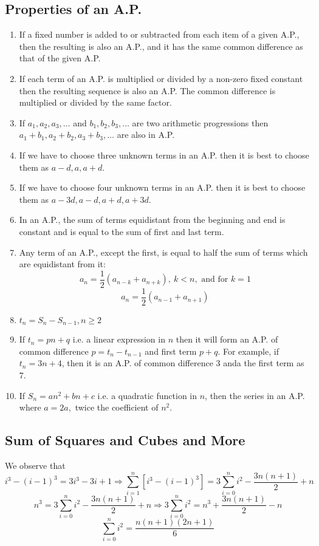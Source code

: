 \subsection{Properties of an A.P.}
\begin{enumerate}
\item If a fixed number is added to or subtracted from each item of a given A.P., then the resulting is also an A.P., and it has
  the same common difference as that of the given A.P.
\item If each term of an A.P. is multiplied or divided by a non-zero fixed constant then the resulting sequence is also an A.P. The
  common difference is multiplied or divided by the same factor.
\item If $a_1, a_2, a_3, \ldots$ and $b_1, b_2, b_3, \ldots$ are two arithmetic progressions then $a_1 + b_1, a_2 + b_2, a_3 + b_3,
  \ldots$ are also in A.P.
\item If we have to choose three unknown terms in an A.P. then it is best to choose them as $a - d, a, a + d$.
\item If we have to choose four unknown terms in an A.P. then it is best to choose them as $a - 3d, a - d, a + d, a + 3d$.
\item In an A.P., the sum of terms equidistant from the beginning and end is constant and is equal to the sum of first and last
  term.
\item Any term of an A.P., except the first, is equal to half the sum of terms which are equidistant from it:
  $$a_n = \frac{1}{2}(a_{n - k} + a_{n + k}), ~k<n,\text{~and for~} k = 1$$
  $$a_n = \frac{1}{2}(a_{n - 1} + a_{n + 1})$$
\item $t_n = S_n - S_{n - 1}, n\geq 2$
\item If $t_n = pn + q$ i.e. a linear expression in $n$ then it will form an A.P. of common difference $p = t_n - t_{n - 1}$ and
  first term $p + q$. For example, if $t_n = 3n + 4$, then it is an A.P. of common difference $3$ anda the first term as $7$.
\item If $S_n = an^2 + bn + c$ i.e. a quadratic function in $n$, then the series in an A.P. where $a = 2a,$ twice the coefficient
  of $n^2$.
\end{enumerate}

\subsection{Sum of Squares and Cubes and More}
We observe that
$$i^3 - (i - 1)^3 = 3i^3 - 3i + 1 \Rightarrow \sum_{i = 1}^n[i^3 - (i - 1)^3] = 3\sum_{i = 0}^ni^2 - \frac{3n(n + 1)}{2} + n$$
$$n^3 = 3\sum_{i = 0}^ni^2 - \frac{3n(n + 1)}{2} + n \Rightarrow 3\sum_{i=0}^ni^2 = n^3 + \frac{3n(n + 1)}{2} - n$$
$$\sum_{i=0}^ni^2 = \frac{n(n + 1)(2n + 1)}{6}$$

